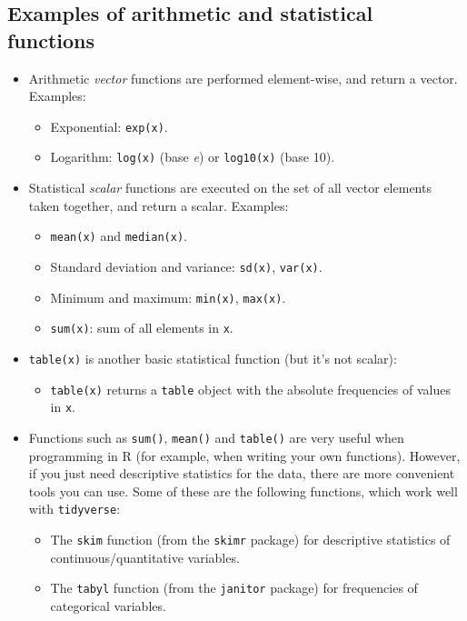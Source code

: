 \documentclass[
]{book}
\providecommand{\tightlist}{%
  \setlength{\itemsep}{0pt}\setlength{\parskip}{0pt}}
\begin{document}
\hypertarget{examples-of-arithmetic-and-statistical-functions}{%
\subsection{Examples of arithmetic and statistical functions}\label{examples-of-arithmetic-and-statistical-functions}}

\begin{itemize}
\tightlist
\item
  Arithmetic \emph{vector} functions are performed element-wise, and return a vector. Examples:

  \begin{itemize}
  \tightlist
  \item
    Exponential: \texttt{exp(x)}.
  \item
    Logarithm: \texttt{log(x)} (base \emph{e}) or \texttt{log10(x)} (base 10).
  \end{itemize}
\item
  Statistical \emph{scalar} functions are executed on the set of all vector elements taken together, and return a scalar. Examples:

  \begin{itemize}
  \tightlist
  \item
    \texttt{mean(x)} and \texttt{median(x)}.
  \item
    Standard deviation and variance: \texttt{sd(x)}, \texttt{var(x)}.
  \item
    Minimum and maximum: \texttt{min(x)}, \texttt{max(x)}.
  \item
    \texttt{sum(x)}: sum of all elements in \texttt{x}.
  \end{itemize}
\item
  \texttt{table(x)} is another basic statistical function (but it's not scalar):

  \begin{itemize}
  \tightlist
  \item
    \texttt{table(x)} returns a \texttt{table} object with the absolute frequencies of values in \texttt{x}.
  \end{itemize}
\item
  Functions such as \texttt{sum()}, \texttt{mean()} and \texttt{table()} are very useful when programming in R (for example, when writing your own functions). However, if you just need descriptive statistics for the data, there are more convenient tools you can use. Some of these are the following functions, which work well with \texttt{tidyverse}:

  \begin{itemize}
  \tightlist
  \item
    The \texttt{skim} function (from the \texttt{skimr} package) for descriptive statistics of continuous/quantitative variables.
  \item
    The \texttt{tabyl} function (from the \texttt{janitor} package) for frequencies of categorical variables.
  \end{itemize}
\end{itemize}
\end{document}
